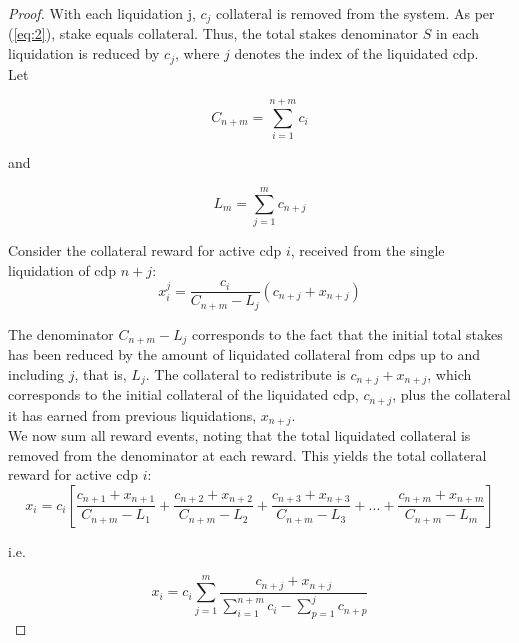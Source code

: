 \documentclass[reqno]{article}
\begin{document}
\begin{proof}
With each liquidation j, $c_j$ collateral is removed from the system. As per (\ref{eq:2}), stake equals collateral. Thus, the total stakes denominator $S$ in each liquidation is reduced by $c_j$, where $j$ denotes the index of the liquidated cdp.\\ 


Let

\begin{equation} 
    C_{n+m}=\sum\limits^{n+m}_{i=1}c_i
\end{equation}

\bigskip
and

\begin{equation} 
    L_m=\sum\limits^m_{j=1}c_{n+j}
\end{equation}

\bigskip
Consider the collateral reward for active cdp $i$, received from the single liquidation of cdp $n + j$: 
 \\

\begin{equation} 
  x_i^j = \frac{c_i}{C_{n+m}-L_j}(c_{n+j}+x_{n+j})
\end{equation}

The denominator $C_{n+m}-L_j$ corresponds to the fact that the initial total stakes has been reduced by the amount of liquidated collateral from  cdps up to and including $j$, that is, $L_j$. The collateral to redistribute is $c_{n+j}+x_{n+j}$, which corresponds to the initial collateral of the liquidated cdp, $c_{n+j}$, plus the collateral it has earned from previous liquidations, $x_{n+j}$. \\

We now sum all reward events, noting that the total liquidated collateral is removed from the denominator at each reward. This yields the total collateral reward for active cdp $i$:\\

\begin{equation} 
    x_i=c_i\left[\frac{c_{n+1}+x_{n+1}}{C_{n+m}-L_1}+\frac{c_{n+2}+x_{n+2}}{C_{n+m}-L_2}+\frac{c_{n+3}+x_{n+3}}{C_{n+m}-L_3}+...+\frac{c_{n+m}+x_{n+m}}{C_{n+m}-L_m}\right]
\end{equation}

\bigskip
i.e.

\begin{equation} 
    x_i=c_i\sum\limits^m_{j=1}\frac{c_{n+j}+x_{n+j}}{\sum\limits^{n+m}_{i=1}c_i-\sum\limits^j_{p=1}c_{n+p}}
\end{equation}


\end{proof}
\end{document}
